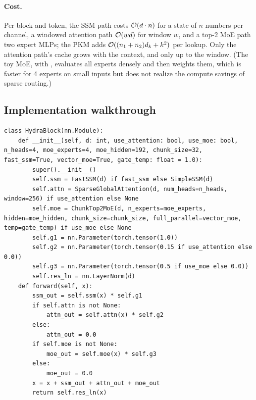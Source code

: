 \paragraph{Cost.} Per block and token, the SSM path costs $\mathcal{O}(d\cdot n)$ for a state of $n$
numbers per channel, a windowed attention path $\mathcal{O}(wd)$ for window $w$, and a top-2 MoE path two
expert MLPs; the PKM adds $\mathcal{O}((n_1+n_2)d_k + k^2)$ per lookup. Only the attention path's cache
grows with the context, and only up to the window. (The toy MoE, with ,
evaluates all experts densely and then weights them, which is faster for 4 experts on small inputs
but does not realize the compute savings of sparse routing.)

\subsection{Implementation walkthrough}

\begin{lstlisting}[caption={Excerpt from \texttt{repos/\allowbreak sidcraftscode\_\_hydra/\allowbreak toy\_hydra.py} (\texttt{HydraBlock}).},label={lst:c12-hydra-block}]
class HydraBlock(nn.Module):
    def __init__(self, d: int, use_attention: bool, use_moe: bool, n_heads=4, moe_experts=4, moe_hidden=192, chunk_size=32, fast_ssm=True, vector_moe=True, gate_temp: float = 1.0):
        super().__init__()
        self.ssm = FastSSM(d) if fast_ssm else SimpleSSM(d)
        self.attn = SparseGlobalAttention(d, num_heads=n_heads, window=256) if use_attention else None
        self.moe = ChunkTop2MoE(d, n_experts=moe_experts, hidden=moe_hidden, chunk_size=chunk_size, full_parallel=vector_moe, temp=gate_temp) if use_moe else None
        self.g1 = nn.Parameter(torch.tensor(1.0))
        self.g2 = nn.Parameter(torch.tensor(0.15 if use_attention else 0.0))
        self.g3 = nn.Parameter(torch.tensor(0.5 if use_moe else 0.0))
        self.res_ln = nn.LayerNorm(d)
    def forward(self, x):
        ssm_out = self.ssm(x) * self.g1
        if self.attn is not None:
            attn_out = self.attn(x) * self.g2
        else:
            attn_out = 0.0
        if self.moe is not None:
            moe_out = self.moe(x) * self.g3
        else:
            moe_out = 0.0
        x = x + ssm_out + attn_out + moe_out
        return self.res_ln(x)
\end{lstlisting}

